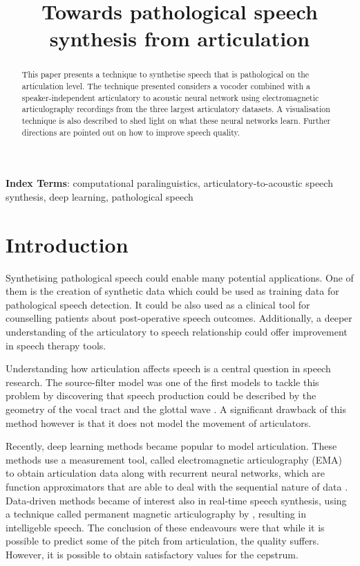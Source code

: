 \documentclass[a4paper]{article}
\title{Towards pathological speech synthesis from articulation}
\begin{document}
\maketitle
% 
\begin{abstract}
  This paper presents a technique to synthetise speech that is pathological on the articulation level.
  The technique presented considers a vocoder combined with a speaker-independent articulatory to acoustic neural network using electromagnetic articulography recordings from the three largest articulatory datasets.
  A visualisation technique is also described to shed light on what these neural networks learn. Further directions are pointed out on how to improve speech quality.
\end{abstract}
\noindent\textbf{Index Terms}: computational paralinguistics, articulatory-to-acoustic
speech synthesis, deep learning, pathological speech

\section{Introduction}

Synthetising pathological speech could enable many potential applications.
One of them is the creation of synthetic data which could be
used as training data for pathological speech detection. It could be also used as a
clinical tool for counselling patients about post-operative speech outcomes. Additionally, a
deeper understanding of the articulatory to speech relationship could offer improvement
in speech therapy tools.

Understanding how articulation affects speech is a central question in speech
research. The source-filter model was one of the first models to tackle this
problem by discovering that speech production could be described by
the geometry of the vocal tract and the glottal wave \cite{Benesty2009} \cite{Fant1981}.
A significant drawback of this method however is that it does not model the movement of articulators.

Recently, deep learning methods became popular
to model articulation. These methods use a measurement tool,
called electromagnetic articulography (EMA) to obtain articulation data 
\cite{Aryal2016} \cite{Taguchi} \cite{Liu2018} along with recurrent
neural networks, which are function approximators that are able to deal with
the sequential nature of data \cite{Hochreiter1997}. Data-driven methods became of interest also
in real-time speech synthesis, using a technique called permanent magnetic articulography
by \cite{Gonzalez2017}, resulting in intelligeble
speech. The conclusion of these endeavours were that while it is possible to
predict some of the pitch from articulation, the quality suffers.
However, it is possible to obtain satisfactory values for the
cepstrum.
\end{document}

